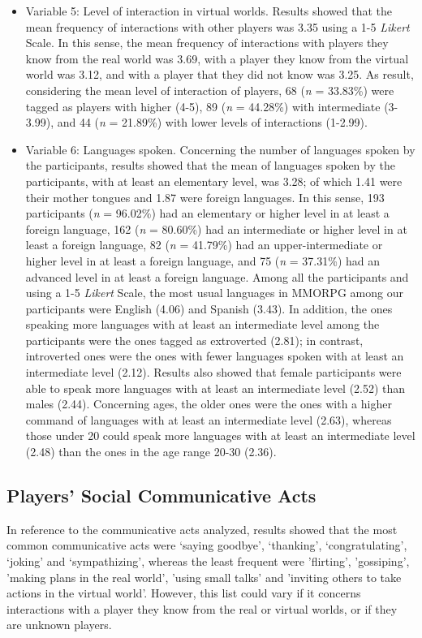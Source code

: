 \documentclass[english]{textolivre}
\begin{document}
\begin{itemize}
\item Variable 5: Level of interaction in virtual worlds. Results showed that the mean frequency of interactions with other players was 3.35 using a 1-5 \emph{Likert} Scale. In this sense, the mean frequency of interactions with players they know from the real world was 3.69, with a player they know from the virtual world was 3.12, and with a player that they did not know was 3.25. As result, considering the mean level of interaction of players, 68 (\emph{n} = 33.83\%) were tagged as players with higher (4-5), 89 (\emph{n} = 44.28\%) with intermediate (3-3.99), and 44 (\emph{n} = 21.89\%) with lower levels of interactions (1-2.99).
\item Variable 6: Languages spoken. Concerning the number of languages spoken by the participants, results showed that the mean of languages spoken by the participants, with at least an elementary level, was 3.28; of which 1.41 were their mother tongues and 1.87 were foreign languages. In this sense, 193 participants (\emph{n} = 96.02\%) had an elementary or higher level in at least a foreign language, 162 (\emph{n} = 80.60\%) had an intermediate or higher level in at least a foreign language, 82 (\emph{n} = 41.79\%) had an upper-intermediate or higher level in at least a foreign language, and 75 (\emph{n} = 37.31\%) had an advanced level in at least a foreign language. Among all the participants and using a 1-5 \emph{Likert} Scale, the most usual languages in MMORPG among our participants were English (4.06) and Spanish (3.43). In addition, the ones speaking more languages with at least an intermediate level among the participants were the ones tagged as extroverted (2.81); in contrast, introverted ones were the ones with fewer languages spoken with at least an intermediate level (2.12). Results also showed that female participants were able to speak more languages with at least an intermediate level (2.52) than males (2.44). Concerning ages, the older ones were the ones with a higher command of languages with at least an intermediate level (2.63), whereas those under 20 could speak more languages with at least an intermediate level (2.48) than the ones in the age range 20-30 (2.36). 
\end{itemize}

\subsection{Players’ Social Communicative Acts}
In reference to the communicative acts analyzed, results showed that the most common communicative acts were ‘saying goodbye’, ‘thanking’, ‘congratulating’, ‘joking’ and ‘sympathizing', whereas the least frequent were 'flirting', 'gossiping', 'making plans in the real world', 'using small talks' and 'inviting others to take actions in the virtual world'. However, this list could vary if it concerns interactions with a player they know from the real or virtual worlds, or if they are unknown players. 
\end{document}

